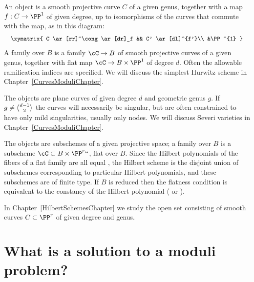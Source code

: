 \begin{example} An object is a smooth projective curve $C$
%
of a given genus, together with a map $f: C\to \PP^1$ of given degree, up
to isomorphisms of the curves that commute with the map, as in this diagram:
\vspace*{2pt}
$$
\vspace*{2pt}
\small
\xymatrix{
C  \ar[rr]^\cong \ar[dr]_f && C' \ar[dl]^{f'}\\
&\PP^{1}
}
$$
A family over $B$ is a family $\cC \to B$ of smooth projective curves
of a given genus, together with flat map $\cC \to B\times \PP^{1}$
of degree $d$.
 Often the allowable ramification indices are specified. We will discuss
 the simplest Hurwitz scheme in Chapter~\ref{CurvesModuliChapter}.
\end{example}

\begin{example} The objects are plane curves
%
\label{Severi}%
of given degree $d$ and geometric genus $g$. If $g \neq \tbinom{d-1}{ 2}$
the curves will necessarily be singular, but are often
constrained to have only mild singularities, usually only nodes. We will
discuss
Severi varieties
in Chapter~\ref{CurvesModuliChapter}.
\end{example}

\begin{example} The objects are subschemes of a given
%
projective space;   a family over $B$ is a subscheme $\cC \subset B \times
\PP^r` `$, flat over $B$. Since the Hilbert polynomials of the fibers
of a
flat family
%
are all equal
\cite[Chapter III, \S9]{Hartshorne1977},
the Hilbert scheme is the disjoint union of subschemes corresponding to
particular Hilbert polynomials, and these subschemes are of finite type.
%
If $B$ is reduced then the flatness condition is equivalent to the
constancy of the Hilbert polynomial (\cite[Theorem 9.9]{Hartshorne1977} or \cite[Chapter III, \S 3.2]{DE-JH-schemes}).

In Chapter~\ref{HilbertSchemesChapter} we
study the
open set consisting of smooth curves $C\subset \PP^{r}$ of given degree
and genus.
\end{example}

\section{What is a solution to a moduli problem?}

